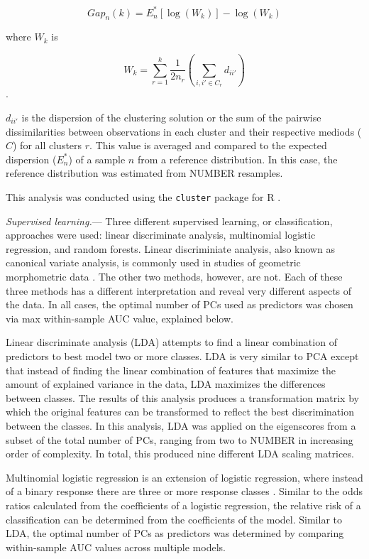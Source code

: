 \documentclass[12pt,letterpaper]{article}
\renewcommand{\subsubsection}[1]{%
\vspace{2ex}
\noindent
\textit{#1.}---}
\begin{document}
\[Gap_{n}(k) = E^{*}_{n}[\log(W_{k})] - \log(W_{k})\] 

where \(W_{k}\) is

\[W_{k} = \sum^{k}_{r = 1}{\frac{1}{2n_{r}} (\sum_{i,i' \in C_{r}} d_{ii'})}\].

\(d_{ii'}\) is the dispersion of the clustering solution or the sum of the pairwise dissimilarities between observations in each cluster and their respective mediods (\(C\)) for all clusters \(r\). This value is averaged and compared to the expected dispersion (\(E^{*}_{n}\)) of a sample \(n\) from a reference distribution. In this case, the reference distribution was estimated from NUMBER resamples.

This analysis was conducted using the \texttt{cluster} package for R \citep{Maechler2013}.

\subsubsection{Supervised learning}
Three different supervised learning, or classification, approaches were used: linear discriminate analysis, multinomial logistic regression, and random forests. Linear discriminiate analysis, also known as canonical variate analysis, is commonly used in studies of geometric morphometric data \citep{Zelditch2004,Mitteroecker2011}. The other two methods, however, are not. Each of these three methods has a different interpretation and reveal very different aspects of the data. In all cases, the optimal number of PCs used as predictors was chosen via max within-sample AUC value, explained below.

Linear discriminate analysis (LDA) attempts to find a linear combination of predictors to best model two or more classes. LDA is very similar to PCA except that instead of finding the linear combination of features that maximize the amount of explained variance in the data, LDA maximizes the differences between classes. The results of this analysis produces a transformation matrix by which the original features can be transformed to reflect the best discrimination between the classes. In this analysis, LDA was applied on the eigenscores from a subset of the total number of PCs, ranging from two to NUMBER in increasing order of complexity. In total, this produced nine different LDA scaling matrices. 

Multinomial logistic regression is an extension of logistic regression, where instead of a binary response there are three or more response classes \citep{Venables2002a}. Similar to the odds ratios calculated from the coefficients of a logistic regression, the relative risk of a classification can be determined from the coefficients of the model. Similar to LDA, the optimal number of PCs as predictors was determined by comparing within-sample AUC values across multiple models.
\end{document}
